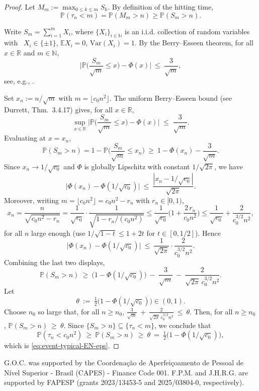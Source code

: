 \documentclass[preprint]{imsart}
\newcommand{\PP}{\mathbb{P}}
\newcommand{\EE}{\mathbb{E}}
\newcommand{\1}{\mathbf{1}}
\theoremstyle{plain}
\theoremstyle{definition}
\begin{document}
\begin{proof} Let $M_m:=\max_{0\le k\le m} S_k$. By definition of the hitting time,
\begin{equation}\label{MaxS_n}
\PP(\tau_n< m)=\PP(M_m> n)\ge \PP(S_m> n).
\end{equation}

\smallskip
Write $S_m=\sum_{i=1}^m X_i$, where $\{X_i\}_{i\in \mathbb{N}}$ is an i.i.d. collection of random variables with \ $X_i\in\{\pm1\}$, $\EE X_i=0$, $\text{Var}(X_i)=1$. By the Berry–Esseen theorem, for all $x\in\mathbb R$ and $m\in\mathbb N$,
\[
\Big|\PP\!\Big(\frac{S_m}{\sqrt m}\le x\Big)-\Phi(x)\Big|\ \le\ \frac{3}{\sqrt m},
\]
see, e.g., \cite[Thm.~3.4.17]{DurrettPTE}. 

Set $x_n:=n/\sqrt{m}$ with $m=\lfloor c_0 n^2\rfloor$. The uniform Berry–Esseen bound
(see Durrett, Thm.~3.4.17) gives, for all $x\in\mathbb R$,
\[
\sup_{x\in\mathbb R}\Big|\PP\!\Big(\frac{S_m}{\sqrt m}\le x\Big)-\Phi(x)\Big|
\;\le\;\frac{3}{\sqrt m}.
\]
Evaluating at $x=x_n$,
\[
\PP(S_m> n)
=1-\PP\!\Big(\frac{S_m}{\sqrt m}\le x_n\Big)
\ \ge\ 1-\Phi(x_n)-\frac{3}{\sqrt m}.
\]
Since $x_n\to 1/\sqrt{c_0}$ and $\Phi$ is globally Lipschitz with constant
\(1/\sqrt{2\pi}\), we have
\[
\big|\Phi(x_n)-\Phi(1/\sqrt{c_0})\big|\ \le\ \frac{|x_n-1/\sqrt{c_0}|}{\sqrt{2\pi}}.
\]
Moreover, writing $m=\lfloor c_0 n^2\rfloor=c_0 n^2-r_n$ with $r_n\in[0,1)$,
\[
x_n=\frac{n}{\sqrt{c_0 n^2-r_n}}
=\frac{1}{\sqrt{c_0}}\cdot\frac{1}{\sqrt{1-r_n/(c_0 n^2)}}
\le \frac{1}{\sqrt{c_0}}\Big(1+\frac{2\,r_n}{c_0 n^2}\Big)
\le \frac{1}{\sqrt{c_0}}+\frac{2}{c_0^{3/2}n^2},
\]
for all $n$ large enough (use $1/\sqrt{1-t}\le 1+2t$ for $t\in[0,1/2]$). Hence
\[
\big|\Phi(x_n)-\Phi(1/\sqrt{c_0})\big|\ \le\ \frac{1}{\sqrt{2\pi}}\cdot \frac{2}{c_0^{3/2}n^2}.
\]
Combining the last two displays,
\[
\PP(S_m> n)\ \ge\ \big(1-\Phi(1/\sqrt{c_0})\big)\ -\ \frac{3}{\sqrt m}\ -\
\frac{2}{\sqrt{2\pi}\,c_0^{3/2}n^2}.
\]
Let
\[
\theta\ :=\ \tfrac12\big(1-\Phi(1/\sqrt{c_0})\big)\in(0,1).
\]
Choose $n_0$ so large that, for all $n\ge n_0$, \(\frac{3}{\sqrt m}\ +\ \frac{2}{\sqrt{2\pi}\,c_0^{3/2}n^2}\ \le\ \theta\). Then, for all $n\ge n_0$, \(\PP(S_m> n)\ \ge\ \theta\). Since $\{S_m> n\}\subseteq\{\tau_n< m\}$, we conclude that
\[
\PP(\tau_n< c_0 n^2)\ \ge\ \PP(S_m> n)\ \ge\ \theta
\ =\ \tfrac12\big(1-\Phi(1/\sqrt{c_0})\big),
\]
which is \eqref{eq:event-typical-EN-eps}.

\end{proof}




\begin{acks}[Acknowledgments]
G.O.C. was supported by the Coordenação de Aperfeiçoamento de Pessoal de Nível Superior - Brasil (CAPES) - Finance Code 001. F.P.M. and J.H.R.G. are  supported by FAPESP (grants 2023/13453-5 and 2025/03804-0, respectively).
\end{acks}
\end{document}
